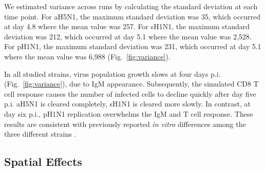 \documentclass[preprint,10pt,numbers]{elsarticle}
\begin{document}

We estimated variance across runs by calculating the standard deviation at each time point.  For aH5N1, the maximum standard deviation was 35, which occurred at day 4.8 where the mean value was 257.  For sH1N1, the maximum standard deviation was 212, which occurred at day 5.1 where the mean value was 2,528.  For pH1N1, the maximum standard deviation was 231, which occurred at day 5.1 where the mean value was 6,988 (Fig.~\ref{fig:variance}).

In all studied strains, virus population growth slows at four days p.i. (Fig.~\ref{fig:variance}), due to IgM appearance.  Subsequently, the simulated CD8 T cell response causes the number of infected cells to decline quickly after day five p.i.  aH5N1 is cleared completely, sH1N1 is cleared more slowly.  In contrast, at day six p.i., pH1N1 replication overwhelms the IgM and T cell response.  These results are consistent with previously reported \textit{in vitro} differences among the three different strains \citep{Mitchell2011}.



\subsection*{Spatial Effects}

\end{document}

